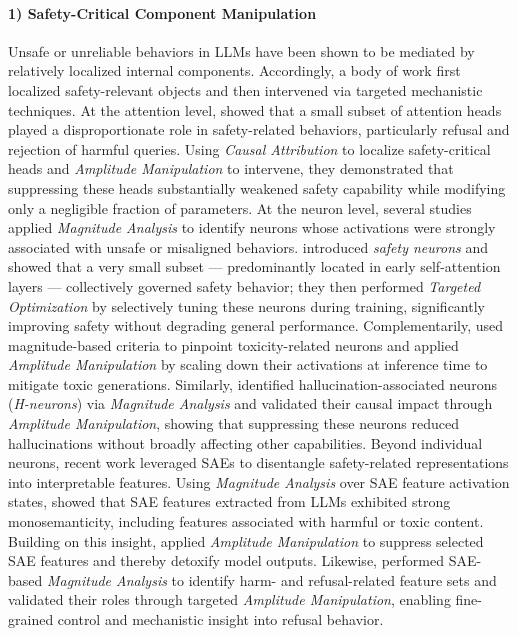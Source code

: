 \documentclass[11pt,letterpaper]{mystyle}
\begin{document}
  \paragraph{1) Safety-Critical Component Manipulation} Unsafe or unreliable behaviors in LLMs have been shown to be mediated by relatively localized internal components. Accordingly, a body of work first localized safety-relevant objects and then intervened via targeted mechanistic techniques. At the attention level, \citet{zhou2025on} showed that a small subset of attention heads played a disproportionate role in safety-related behaviors, particularly refusal and rejection of harmful queries. Using \textit{Causal Attribution} to localize safety-critical heads and \textit{Amplitude Manipulation} to intervene, they demonstrated that suppressing these heads substantially weakened safety capability while modifying only a negligible fraction of parameters. 
  At the neuron level, several studies applied \textit{Magnitude Analysis} to identify neurons whose activations were strongly associated with unsafe or misaligned behaviors. \citet{zhao2025understanding} introduced \emph{safety neurons} and showed that a very small subset --- predominantly located in early self-attention layers --- collectively governed safety behavior; they then performed \textit{Targeted Optimization} by selectively tuning these neurons during training, significantly improving safety without degrading general performance. Complementarily, \citet{suauWhisperingExpertsNeural2024} used magnitude-based criteria to pinpoint toxicity-related neurons and applied \textit{Amplitude Manipulation} by scaling down their activations at inference time to mitigate toxic generations. Similarly, \citet{gao2025hneuronsexistenceimpactorigin} identified hallucination-associated neurons (\textit{H-neurons}) via \textit{Magnitude Analysis} and validated their causal impact through \textit{Amplitude Manipulation}, showing that suppressing these neurons reduced hallucinations without broadly affecting other capabilities. Beyond individual neurons, recent work leveraged SAEs to disentangle safety-related representations into interpretable features. Using \textit{Magnitude Analysis} over SAE feature activation states, \citet{templeton2024scaling} showed that SAE features extracted from LLMs exhibited strong monosemanticity, including features associated with harmful or toxic content.
  Building on this insight, \citet{goyalBreakingBadTokens2025} applied \textit{Amplitude Manipulation} to suppress selected SAE features and thereby detoxify model outputs. Likewise, \citet{yeo-etal-2025-understanding} performed SAE-based \textit{Magnitude Analysis} to identify harm- and refusal-related feature sets and validated their roles through targeted \textit{Amplitude Manipulation}, enabling fine-grained control and mechanistic insight into refusal behavior.
  
\end{document}
